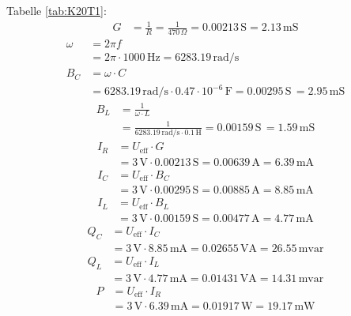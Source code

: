 Tabelle \ref{tab:K20T1}:
\begin{align*}
    G &= \frac{1}{R} = \frac{1}{470 \, \Omega} = 0.00213 \, \mathrm{S} = 2.13 \, \mathrm{mS}
\end{align*}
\begin{align*}
\omega &= 2 \pi f \\
     &= 2 \pi \cdot 1000 \, \mathrm{Hz} = 6283.19 \, \mathrm{rad/s} \\
    B_C &= \omega \cdot C \\
    &= 6283.19 \, \mathrm{rad/s} \cdot 0.47 \cdot 10^{-6} \, \mathrm{F} = 0.00295 \, \mathrm{S} \, = 2.95 \, \mathrm{mS}
\end{align*}
\begin{align*}
    B_L &= \frac{1}{\omega \cdot L} \\
     &= \frac{1}{6283.19 \, \mathrm{rad/s} \cdot 0.1 \, \mathrm{H}} = 0.00159 \, \mathrm{S} \, = 1.59 \, \mathrm{mS}
\end{align*}
\begin{align*}
    I_R &= U_\mathrm{eff} \cdot G \\
     &= 3 \, \mathrm{V} \cdot 0.00213 \, \mathrm{S} = 0.00639 \, \mathrm{A} = 6.39 \, \mathrm{mA}
\end{align*}
\begin{align*}
I_C &= U_\mathrm{eff} \cdot B_C \\
     &= 3 \, \mathrm{V} \cdot 0.00295 \, \mathrm{S} = 0.00885 \, \mathrm{A} = 8.85 \, \mathrm{mA} 
\end{align*}
\begin{align*}
I_L &= U_\mathrm{eff} \cdot B_L \\
     &= 3 \, \mathrm{V} \cdot 0.00159 \, \mathrm{S} = 0.00477 \, \mathrm{A} = 4.77 \, \mathrm{mA}
\end{align*}
\begin{align*}
Q_C &= U_\mathrm{eff} \cdot I_C \\
     &= 3 \, \mathrm{V} \cdot 8.85 \, \mathrm{mA} = 0.02655 \, \mathrm{VA} = 26.55 \, \mathrm{mvar}
\end{align*}
\begin{align*}
Q_L &= U_\mathrm{eff} \cdot I_L \\
     &= 3 \, \mathrm{V} \cdot 4.77 \, \mathrm{mA} = 0.01431 \, \mathrm{VA} = 14.31 \, \mathrm{mvar}
\end{align*}
\begin{align*}
P &= U_\mathrm{eff} \cdot I_R \\
     &= 3 \, \mathrm{V} \cdot 6.39 \, \mathrm{mA} = 0.01917 \, \mathrm{W} = 19.17 \, \mathrm{mW}
\end{align*}
